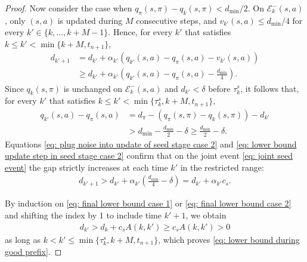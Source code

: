 \begin{proof}
Now consider the case when $q_\pi(s,\pi) - q_{k}(s,\pi) < d_{\min}/2$.
On $\mathcal E^-_k(s,a)$, only $(s, a)$ is updated during $M$ consecutive steps, and $v_{k'}(s,a) \le d_{\min}/4$ for every $k' \in \{k, \dots, k+M-1\}$.
Hence, for every $k'$ that satisfies 
$k \le k' < \min \{k+M, t_{n+1} \}$,
\begin{align}
\nonumber
    d_{k'+1}
    &= d_{k'} + \alpha_{k'}(q_{k'}(s,a) - q_\pi(s,a) - v_{k'}(s,a))
    \\
\label{eq: plug noise into update of seed stage case 2}
    &\ge d_{k'} + \alpha_{k'} \left( q_{k'}(s,a) - q_\pi(s,a) - \frac{d_{\min}}{4} \right) .
\end{align}
Since $q_{k}(s,\pi)$ is unchanged on $\mathcal E^-_k(s,a)$
and $d_{k'} < \delta$ before $\tau^s_k$,
it follows that, for every $k'$ that satisfies 
$k \le k' < \min\{ \tau^s_k , k+M , t_{n+1} \}$,
\begin{align}
\nonumber
    q_{k'}(s,a) - q_\pi(s,a)
    &= d_\pi - ( q_\pi(s,\pi) - q_{k}(s,\pi) ) - d_{k'}
    \\
\label{eq: lower bound update step in seed stage case 2}
    &> d_{\min} - \frac{d_{\min}}{2} - \delta
    \ge \frac{d_{\min}}{2} - \delta .
\end{align}
Equations \eqref{eq: plug noise into update of seed stage case 2} and \eqref{eq: lower bound update step in seed stage case 2}
confirm that on the joint event \eqref{eq: joint seed event}
the gap strictly increases at each time $k'$ in the restricted range:
\begin{align}
\label{eq: final lower bound case 2}
    d_{k'+1}
    > d_{k'} + \alpha_{k'} \left( \frac{d_{\min}}{4} - \delta \right)
    = d_{k'} + \alpha_{k'} c_s .
\end{align}

By induction on \eqref{eq: final lower bound case 1} or \eqref{eq: final lower bound case 2} and shifting the index by 1 to include time $k'+1$, we obtain
\begin{align}
\label{eq: increase in d^b case B}
    d_{k'}
    > d_{k} + c_s A(k,k')
    \ge c_s A(k,k') > 0
\end{align}
as long as 
$k < k' \le \min\{ \tau^s_k , k+M , t_{n+1} \}$, 
which proves \eqref{eq: lower bound during good prefix}.


\end{proof}
